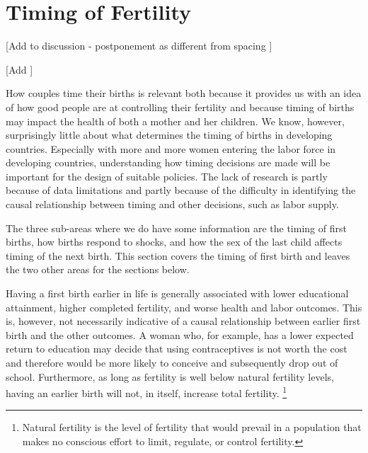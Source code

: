 \documentclass[letterpaper,12pt]{article}
\begin{document}
\section{Timing of Fertility}\label{timing-of-fertility}

[Add \citep{Timaeus2008} to discussion - postponement as different from spacing
\citep{Moultrie2012}
]

[Add \citep{Casterline2016}]

How couples time their births is relevant both because it provides us
with an idea of how good people are at controlling their fertility and
because timing of births may impact the health of both a mother and her
children.
We know, however, surprisingly little about what determines the timing
of births in developing countries.
Especially with more and more women entering the labor force in
developing countries, understanding how timing decisions are made will
be important for the design of suitable policies.
The lack of research is partly because of data limitations and partly
because of the difficulty in identifying the causal relationship between
timing and other decisions, such as labor supply.

The three sub-areas where we do have some information are the timing of
first births, how births respond to shocks, and how the sex of the last
child affects timing of the next birth.
This section covers the timing of first birth and leaves the two other
areas for the sections below.

Having a first birth earlier in life is generally associated with lower
educational attainment, higher completed fertility, and worse health and
labor outcomes.
This is, however, not necessarily indicative of a causal relationship
between earlier first birth and the other outcomes.
A woman who, for example, has a lower expected return to education may
decide that using contraceptives is not worth the cost and therefore
would be more likely to conceive and subsequently drop out of school.
Furthermore, as long as fertility is well below natural fertility
levels, having an earlier birth will not, in itself, increase total
fertility.%
\footnote{
Natural fertility is the level of fertility that would prevail in a
population that makes no conscious effort to limit, regulate, or control
fertility.}
\end{document}
